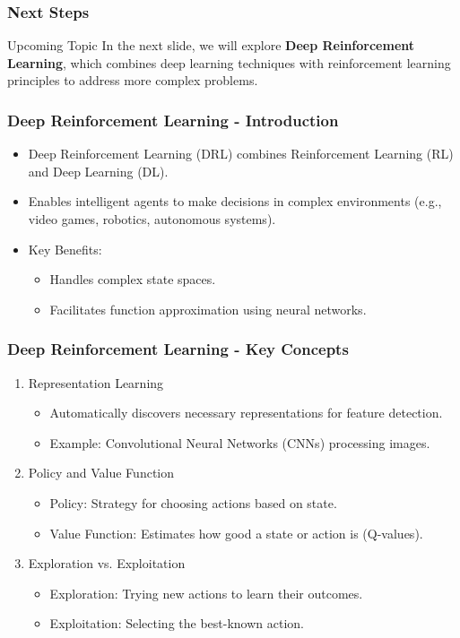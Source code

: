 \documentclass[aspectratio=169]{beamer}
\begin{document}
\begin{frame}[fragile]
    \frametitle{Next Steps}

    \begin{block}{Upcoming Topic}
        In the next slide, we will explore \textbf{Deep Reinforcement Learning}, which combines deep learning techniques with reinforcement learning principles to address more complex problems.
    \end{block}
\end{frame}

\begin{frame}[fragile]
    \frametitle{Deep Reinforcement Learning - Introduction}
    \begin{itemize}
        \item Deep Reinforcement Learning (DRL) combines Reinforcement Learning (RL) and Deep Learning (DL).
        \item Enables intelligent agents to make decisions in complex environments (e.g., video games, robotics, autonomous systems).
        \item Key Benefits:
            \begin{itemize}
                \item Handles complex state spaces.
                \item Facilitates function approximation using neural networks.
            \end{itemize}
    \end{itemize}
\end{frame}

\begin{frame}[fragile]
    \frametitle{Deep Reinforcement Learning - Key Concepts}
    \begin{enumerate}
        \item Representation Learning
        \begin{itemize}
            \item Automatically discovers necessary representations for feature detection.
            \item Example: Convolutional Neural Networks (CNNs) processing images.
        \end{itemize}
        
        \item Policy and Value Function
        \begin{itemize}
            \item Policy: Strategy for choosing actions based on state.
            \item Value Function: Estimates how good a state or action is (Q-values).
        \end{itemize}
        
        \item Exploration vs. Exploitation
        \begin{itemize}
            \item Exploration: Trying new actions to learn their outcomes.
            \item Exploitation: Selecting the best-known action.
        \end{itemize}
    \end{enumerate}
\end{frame}
\end{document}
